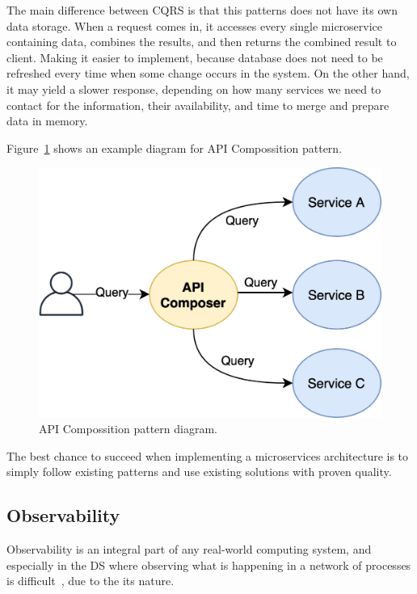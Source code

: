 \begin{enumerate}
	The main difference between CQRS is that this patterns does not have its own data storage. When a request comes in, it accesses every single microservice containing data, combines the results, and then returns the combined result to client. Making it easier to implement, because database does not need to be refreshed every time when some change occurs in the system. On the other hand, it may yield a slower response, depending on how many services we need to contact for the information, their availability, and time to merge and prepare data in memory. 

	Figure~\ref{fig:fig22} shows an example diagram for API Compossition pattern.

	\begin{figure}[H]
		\begin{center}
			\includegraphics[scale=0.7]{images/Figure22}
		\end{center}
		\vspace{-0.6cm}
		\caption{API Compossition pattern diagram.}
		\label{fig:fig22}
	\end{figure}
\end{enumerate}

The best chance to succeed when implementing a microservices architecture is to simply follow existing patterns and use existing solutions with proven quality. 
%
%
\subsection{Observability}\label{sec:log_aggregation}
%
Observability is an integral part of any real-world computing system, and especially in the DS where observing what is happening in a network of processes is difficult~\cite{Fidge96}, due to the its nature.

